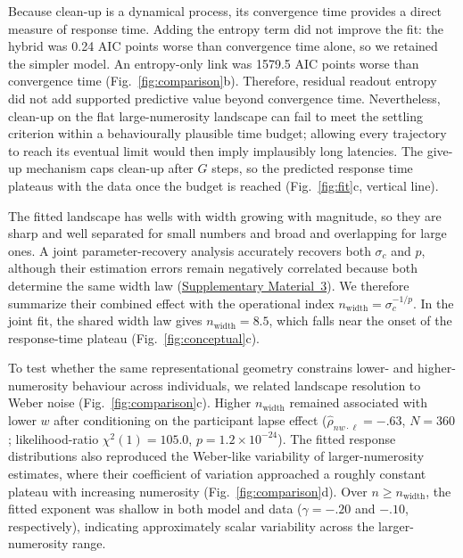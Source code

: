 \documentclass[Afour,sageh,times]{sagej}
\begin{document}
Because clean-up is a dynamical process, its convergence time provides a direct measure of response time. Adding the entropy term did not improve the fit: the hybrid was 0.24 AIC points worse than convergence time alone, so we retained the simpler model. An entropy-only link was 1579.5 AIC points worse than convergence time (Fig.~\ref{fig:comparison}b). Therefore, residual readout entropy did not add supported predictive value beyond convergence time. Nevertheless, clean-up on the flat large-numerosity landscape can fail to meet the settling criterion within a behaviourally plausible time budget; allowing every trajectory to reach its eventual limit would then imply implausibly long latencies. The give-up mechanism caps clean-up after $G$ steps, so the predicted response time plateaus with the data once the budget is reached (Fig.~\ref{fig:fit}c, vertical line).

The fitted landscape has wells with width growing with magnitude, so they are sharp and well separated for small numbers and broad and overlapping for large ones. A joint parameter-recovery analysis accurately recovers both $\sigma_c$ and $p$, although their estimation errors remain negatively correlated because both determine the same width law (\hyperref[sup-sm:recovery]{Supplementary Material~3}). We therefore summarize their combined effect with the operational index $n_{\mathrm{width}}=\sigma_c^{-1/p}$. In the joint fit, the shared width law gives $n_{\mathrm{width}} = 8.5$, which falls near the onset of the response-time plateau (Fig.~\ref{fig:conceptual}c).

To test whether the same representational geometry constrains lower- and higher-numerosity behaviour across individuals, we related landscape resolution to Weber noise (Fig.~\ref{fig:comparison}c). Higher $n_{\mathrm{width}}$ remained associated with lower $w$ after conditioning on the participant lapse effect ($\hat\rho_{nw\cdot\ell}=-.63$, $N=360$; likelihood-ratio $\chi^2(1)=105.0$, $p=1.2\times10^{-24}$). The fitted response distributions also reproduced the Weber-like variability of larger-numerosity estimates, where their coefficient of variation approached a roughly constant plateau with increasing numerosity (Fig.~\ref{fig:comparison}d). Over $n\geq n_{\mathrm{width}}$, the fitted exponent was shallow in both model and data ($\gamma=-.20$ and $-.10$, respectively), indicating approximately scalar variability across the larger-numerosity range.
\end{document}
